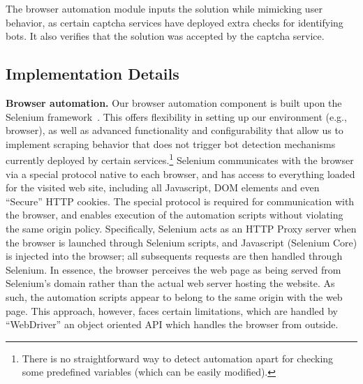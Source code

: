 \protect{} The browser automation module inputs the solution while mimicking 
user behavior, as certain captcha services have deployed extra checks for identifying bots.
It also verifies that the solution was accepted by the captcha service.

\subsection{Implementation Details}

\textbf{Browser automation.}
Our browser automation component is built upon the Selenium framework~\cite{selenium}. This offers
flexibility in setting up our environment (e.g., browser), as well as advanced functionality
and configurability that allow us to implement scraping behavior that does not trigger bot detection
mechanisms currently deployed by certain services.\footnote{There is no straightforward way to detect 
automation apart for checking some predefined variables (which can be easily modified).}
Selenium communicates with the browser via a special protocol 
native to each browser, and has access to everything loaded for the visited web site, including all Javascript, DOM 
elements and even ``Secure'' HTTP cookies. The special protocol is required for communication with the browser,
and enables execution of the automation scripts without violating the same origin policy.
Specifically, Selenium acts as an HTTP Proxy server when
the browser is launched through Selenium scripts, and Javascript (Selenium Core) is injected into the browser;
all subsequents requests are then handled through Selenium. In essence, the browser perceives the
web page as being served from Selenium's domain rather than the actual web server hosting the website.
As such, the automation scripts appear to belong to the same origin with the web page. This approach, 
however, faces certain limitations, which are handled by ``WebDriver'' an object oriented API
which handles the browser from outside. 


